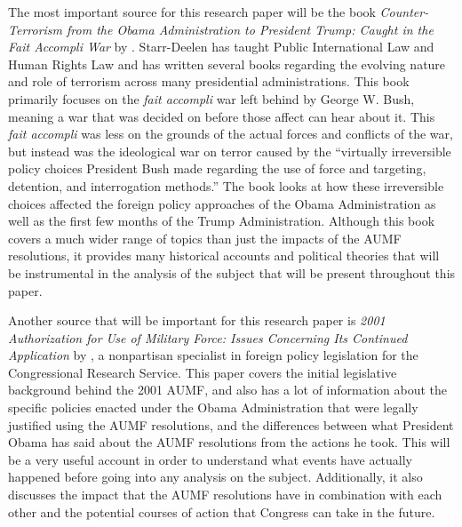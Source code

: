 \documentclass[12pt]{article}
\begin{document}
The most important source for this research paper will be the book \textit{Counter-Terrorism from the Obama Administration to President Trump: Caught in the Fait Accompli War} by \autocite{starr-deelen2018}.
Starr-Deelen has taught Public International Law and Human Rights Law and has written several books regarding the evolving nature and role of terrorism across many presidential administrations.
This book primarily focuses on the \textit{fait accompli} war left behind by George W. Bush, meaning a war that was decided on before those affect can hear about it.
This \textit{fait accompli} was less on the grounds of the actual forces and conflicts of the war, but instead was the ideological war on terror caused by the ``virtually irreversible policy choices President Bush made regarding the use of force and targeting, detention, and interrogation methods.''\autocite[2]{starr-deelen2018}
The book looks at how these irreversible choices affected the foreign policy approaches of the Obama Administration as well as the first few months of the Trump Administration.
Although this book covers a much wider range of topics than just the impacts of the AUMF resolutions, it provides many historical accounts and political theories that will be instrumental in the analysis of the subject that will be present throughout this paper.

Another source that will be important for this research paper is \textit{2001 Authorization for Use of Military Force: Issues Concerning Its Continued Application} by \autocite{weed2015}, a nonpartisan specialist in foreign policy legislation for the Congressional Research Service.
This paper covers the initial legislative background behind the 2001 AUMF, and also has a lot of information about the specific policies enacted under the Obama Administration that were legally justified using the AUMF resolutions, and the differences between what President Obama has said about the AUMF resolutions from the actions he took.
This will be a very useful account in order to understand what events have actually happened before going into any analysis on the subject.
Additionally, it also discusses the impact that the AUMF resolutions have in combination with each other and the potential courses of action that Congress can take in the future.
\end{document}
